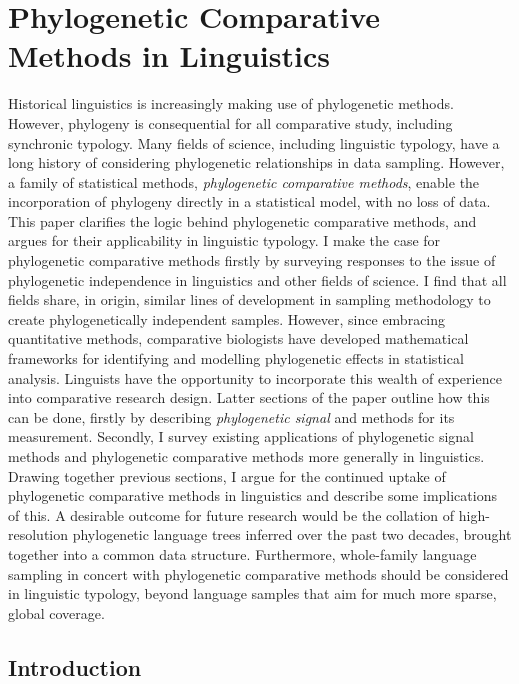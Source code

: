 \chapter[Phylogenetic Comparative Methods]{Phylogenetic Comparative Methods in Linguistics}
\label{ch-pcms}	%
\pagestyle{headings}


Historical linguistics is increasingly making use of phylogenetic methods. However, phylogeny is consequential for all comparative study, including synchronic typology. Many fields of science, including linguistic typology, have a long history of considering phylogenetic relationships in data sampling. However, a family of statistical methods, \emph{phylogenetic comparative methods}, enable the incorporation of phylogeny directly in a statistical model, with no loss of data. This paper clarifies the logic behind phylogenetic comparative methods, and argues for their applicability in linguistic typology. I make the case for phylogenetic comparative methods firstly by surveying responses to the issue of phylogenetic independence in linguistics and other fields of science. I find that all fields share, in origin, similar lines of development in sampling methodology to create phylogenetically independent samples. However, since embracing quantitative methods, comparative biologists have developed mathematical frameworks for identifying and modelling phylogenetic effects in statistical analysis. Linguists have the opportunity to incorporate this wealth of experience into comparative research design. Latter sections of the paper outline how this can be done, firstly by describing \emph{phylogenetic signal} and methods for its measurement. Secondly, I survey existing applications of phylogenetic signal methods and phylogenetic comparative methods more generally in linguistics. Drawing together previous sections, I argue for the continued uptake of phylogenetic comparative methods in linguistics and describe some implications of this. A desirable outcome for future research would be the collation of high-resolution phylogenetic language trees inferred over the past two decades, brought together into a common data structure. Furthermore, whole-family language sampling in concert with phylogenetic comparative methods should be considered in linguistic typology, beyond language samples that aim for much more sparse, global coverage.

\hypertarget{pcm-intro}{%
\section{Introduction}\label{pcm-intro}}


